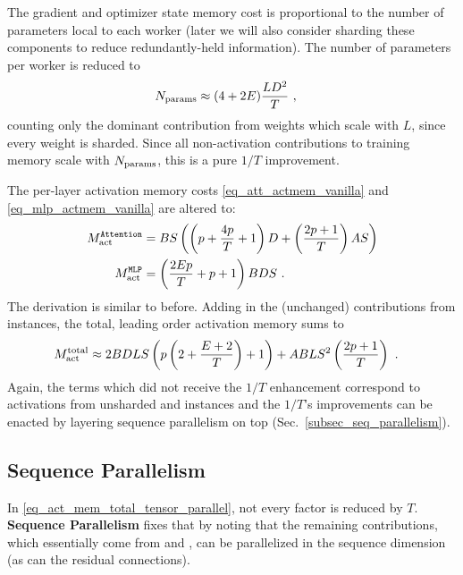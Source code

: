 \documentclass[11pt]{article}
\begin{document}
 The gradient and optimizer state memory cost is proportional to the number of parameters local to
 each worker (later we will also consider sharding these components to reduce redundantly-held
 information). The number of parameters per worker is reduced to
\begin{align}
    N _{ \rm params } &\approx  (4 + 2E) \frac{ L D ^{ 2 } }{ T }\ ,
    \label{eq_approx_params_tensor_parallel}
\end{align}
counting only the dominant contribution from weights which scale with $ L $, since every weight is
sharded. Since all non-activation contributions to training memory scale with $ N _{ {\rm params}  }
$, this is a pure $ 1/T $ improvement.

 The per-layer activation memory costs \eqref{eq_att_actmem_vanilla} and
 \eqref{eq_mlp_actmem_vanilla} are altered to:
\begin{align}
M _{ \rm act  } ^\texttt{Attention} &= BS \left ( \left (p + \frac{ 4p }{ T }+1 \right )D + \left
(\frac{ 2p+1 }{ T } \right )AS  \right ) \nonumber\\
M _{ \rm act  } ^\texttt{MLP} &= \left (\frac{ 2Ep }{ T }+p+1 \right )BDS\ .
\label{eq_act_mem_attn_mlp}
\end{align}
The derivation is similar to before. Adding in the (unchanged) contributions from
 instances, the total, leading order activation memory sums to
\begin{align}
    M _{ {\rm act}  } ^{ {\rm  total}  } & \approx  2BDLS   \left ( p \left (2+ \frac{ E+2 }{ T }\right ) + 1   \right )
    + ABLS ^{ 2 } \left ( \frac{ 2p+1 }{ T }\right ) \label{eq_act_mem_total_tensor_parallel}\ .
\end{align}
Again, the terms which did not receive the $ 1/T $ enhancement correspond to activations from
unsharded  and  instances and the $ 1/T $'s improvements can
be enacted by layering sequence parallelism on top (Sec.~\ref{subsec_seq_parallelism}).


\subsection{Sequence Parallelism \label{subsec_seq_parallelism}}

In \eqref{eq_act_mem_total_tensor_parallel}, not every factor is reduced by $ T $.
\textbf{Sequence Parallelism} fixes that by noting that the remaining contributions, which
essentially come from  and , can be parallelized in the sequence dimension (as can
the residual connections).
\end{document}
